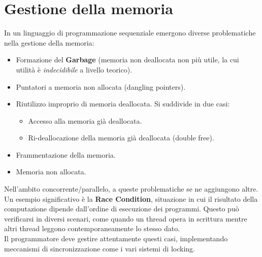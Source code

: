 \documentclass{article}
\begin{document}
\pagestyle{empty}

\section*{Gestione della memoria}
\large

In un linguaggio di programmazione sequenziale emergono diverse problematiche nella gestione della memoria:
\begin{itemize}
    \item Formazione del \textbf{Garbage} (memoria non deallocata non più utile, la cui utilità è \textit{indecidibile} a livello teorico).
    \item Puntatori a memoria non allocata (dangling pointers).
    \item Riutilizzo improprio di memoria deallocata. Si suddivide in due casi:
    \begin{itemize}
        \item Accesso alla memoria già deallocata.
        \item Ri-deallocazione della memoria già deallocata (double free).
    \end{itemize}
    \item Frammentazione della memoria.
    \item Memoria non allocata.
\end{itemize}

Nell'ambito concorrente/parallelo, a queste problematiche se ne aggiungono altre. Un esempio significativo è la \textbf{Race Condition}, situazione in cui il risultato della computazione dipende dall'ordine di esecuzione dei programmi. Questo può verificarsi in diversi scenari, come quando un thread opera in scrittura mentre altri thread leggono contemporaneamente lo stesso dato.\\
Il programmatore deve gestire attentamente questi casi, implementando meccanismi di sincronizzazione come i vari sistemi di locking.
\end{document}
